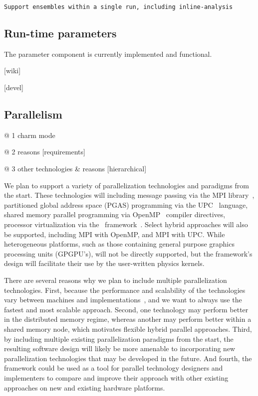 \documentclass[10pt]{article}
\begin{document}
\begin{verbatim}
Support ensembles within a single run, including inline-analysis
\end{verbatim}

\subsection{Run-time parameters} \label{ss:design-parameters}

The parameter component is currently implemented and functional.

[wiki]

[devel]


\subsection{Parallelism} \label{ss:design-parallel}

@ 1 charm mode

@ 2 reasons [requirements]

@ 3 other technologies \& reasons [hierarchical]

We plan to support a variety of parallelization technologies and
paradigms from the start.  These technologies will including message
passing via the MPI library~\cite{wwwmpi}, partitioned global address
space (PGAS) programming via the UPC~\cite{@@@UPC} language, shared
memory parallel programming via OpenMP~\cite{@@@OpenMP} compiler
directives, processor virtualization via the \charm\
framework~\cite{@@@Charm}.  Select hybrid approaches will also be
supported, including MPI with OpenMP, and MPI with UPC.  While
heterogeneous platforms, such as those containing general purpose
graphics processing units (GPGPU's), will not be directly supported,
but the framework's design will facilitate their use by the
user-written physics kernels.

There are several reasons why we plan to include multiple
parallelization technologies.  First, because the performance and
scalability of the technologies vary between machines and
implementations~\cite{MaTa09}, and we want to always use the fastest
and most scalable approach.  Second, one technology may perform better
in the distributed memory regime, whereas another may perform better
within a shared memory node, which motivates flexible hybrid parallel
approaches.  Third, by including multiple existing parallelization
paradigms from the start, the resulting software design will likely be
more amenable to incorporating new parallelization technologies that
may be developed in the future.  And fourth, the framework could be
used as a tool for parallel technology designers and implementers to
compare and improve their approach with other existing approaches on
new and existing hardware platforms.
\end{document}
